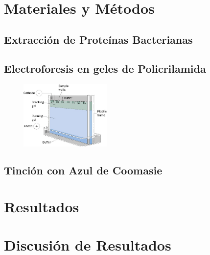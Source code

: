 \documentclass[%
 reprint,
 amsmath,amssymb,
 aps,
showkeys
]{revtex4-1}
\begin{document}
	
\section{\label{sec:MyM}Materiales y Métodos}
	\subsection{\label{sec:ExtraMet}Extracción de Proteínas Bacterianas} 

	\subsection{\label{sec:ElectroMet}Electroforesis en geles de Policrilamida}
	
		\begin{figure}[h]
		\includegraphics[width=0.4\textwidth]{SDS-PAGE.jpg}
		\end{figure} 
	
	\subsection{\label{sec:TinMet}Tinción con Azul de Coomasie}
	
	
\section{\label{sec:Resul}Resultados}


\section{\label{sec:Dis}Discusión de Resultados}




\end{document}
